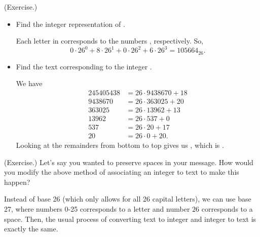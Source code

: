 \documentclass[letterpaper]{article}
\begin{document}
\begin{mdframed}
    (Exercise.) 
    \begin{itemize}
        \item Find the integer representation of .
        \begin{mdframed}
            Each letter in  corresponds to the numbers , respectively. So, 
            \[0 \cdot 26^0 + 8 \cdot 26^1 + 0 \cdot 26^2 + 6 \cdot 26^3 = 105664_{26}.\]
        \end{mdframed}
        \item Find the text corresponding to the integer .
        \begin{mdframed}
            We have 
            \begin{equation*}
                \begin{aligned}
                    245405438 &= 26 \cdot 9438670 + 18 \\ 
                    9438670 &= 26 \cdot 363025 + 20 \\ 
                    363025 &= 26 \cdot 13962 + 13 \\ 
                    13962 &= 26 \cdot 537 + 0 \\ 
                    537 &= 26 \cdot 20 + 17 \\ 
                    20 &= 26 \cdot 0 + 20.
                \end{aligned}
            \end{equation*}
            Looking at the remainders from bottom to top gives us , which is .
        \end{mdframed}
    \end{itemize}
\end{mdframed}

\begin{mdframed}
    (Exercise.) Let's say you wanted to preserve spaces in your message. How would you modify the above method of associating an integer to text to make this happen?

    \begin{mdframed}
        Instead of base 26 (which only allows for all 26 capital letters), we can use base 27, where numbers 0-25 corresponds to a letter and number $26$ corresponds to a space. Then, the usual process of converting text to integer and integer to text is exactly the same.
    \end{mdframed}
\end{mdframed}
\end{document}

